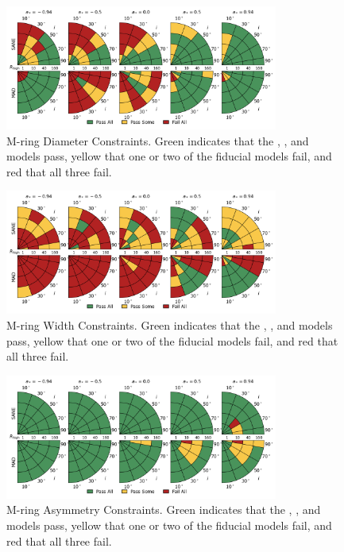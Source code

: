 \begin{figure}
  \centering
  \includegraphics[width=0.8\textwidth]{./figures/Mring_d_Constraints.png}
  \caption{M-ring Diameter Constraints.  Green indicates that the \kharma, \bhac, and \hamr models pass, yellow that one or two of the fiducial models fail, and red that all three fail.}
  \label{fig:mring_diam_pizza}
\end{figure}
\begin{figure}
  \centering
  \includegraphics[width=0.8\textwidth]{./figures/Mring_w_Constraints.png}
  \caption{M-ring Width Constraints.  Green indicates that the \kharma, \bhac, and \hamr models pass, yellow that one or two of the fiducial models fail, and red that all three fail.}
  \label{fig:mring_width_pizza}
\end{figure}
\begin{figure}
  \centering
  \includegraphics[width=0.8\textwidth]{./figures/Mring_f1_Constraints.png}
  \caption{M-ring Asymmetry Constraints.  Green indicates that the \kharma, \bhac, and \hamr models pass, yellow that one or two of the fiducial models fail, and red that all three fail.}
  \label{fig:mring_asymm_pizza}
\end{figure}
